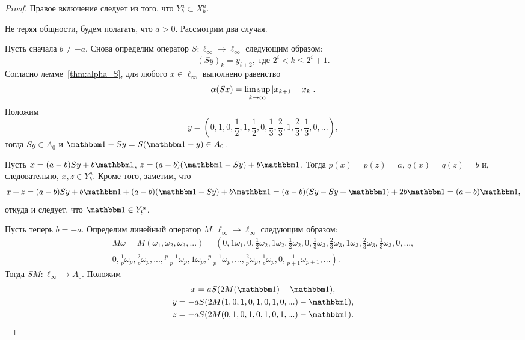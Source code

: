 \begin{proof}
	Правое включение следует из того, что $Y^a_b \subset X^a_b$.

	Не теряя общности, будем полагать, что $a>0$.
	Рассмотрим два случая.

	Пусть сначала $b \ne -a$.
	Снова определим оператор $S:\ell_\infty \to \ell_\infty$ следующим образом:
	\begin{equation}\label{operator_S}
		(Sy)_k = y_{i+2}, \mbox{ где } 2^i < k \leq 2^i+1
		.
	\end{equation}
	Согласно лемме~\ref{thm:alpha_S},
	для любого $x\in \ell_\infty$ выполнено равенство
	\begin{equation}\label{alpha_S}
		\alpha(Sx) = \varlimsup_{k\to\infty} |x_{k+1} - x_{k}|
		.
	\end{equation}
	Положим
	\begin{equation}
		\label{eq:y_for_s_alpha}
		y = \left(0,1,0,\frac{1}{2},1,\frac{1}{2},0,\frac{1}{3},\frac{2}{3},1,\frac{2}{3},\frac{1}{3},0,...\right)
		,
	\end{equation}
	тогда $Sy\in A_0$ и $\one-Sy = S(\one-y)\in A_0$.

	Пусть $x=(a-b)Sy+b\one$, $z=(a-b)(\one-Sy)+b\one$.
	Тогда $p(x)=p(z)=a$, $q(x)=q(z)=b$ и, следовательно, $x,z\in Y^a_b$.
	Кроме того, заметим, что
	\begin{equation}
		x+z = (a-b)Sy+b\one + (a-b)(\one-Sy)+b\one
		=
		(a-b)(Sy-Sy+\one) + 2 b\one = (a+b)\one
		,
	\end{equation}
	откуда и следует, что $\one\in Y^a_b$.

	Пусть теперь $b=-a$.
	Определим линейный оператор $M:\ell_\infty \to \ell_\infty$ следующим образом:
	\begin{multline}
		M\omega=
		M(\omega_1,\omega_2,\omega_3,...)=
		\left(
			0, 1\omega_1,
			0, \frac{1}{2}\omega_2, 1\omega_2, \frac{1}{2}\omega_2,
			0, \frac{1}{3}\omega_3, \frac{2}{3}\omega_3, 1\omega_3, \frac{2}{3}\omega_3, \frac{1}{3}\omega_3,
			0, ...,
		\right. \\ \left.
			0, \frac{1}{p}\omega_p, \frac{2}{p}\omega_p, ..., \frac{p-1}{p}\omega_p, 1\omega_p,
				\frac{p-1}{p}\omega_p, ..., \frac{2}{p}\omega_p, \frac{1}{p}\omega_p,
			0, \frac{1}{p+1}\omega_{p+1}, ...
		\right)
		.
	\end{multline}
	Тогда $SM: \ell_\infty \to A_0$.
	Положим
	\begin{gather}
		x=aS(2M(\one)-\one),
		\\
		y=-aS(2M(1,0,1,0,1,0,1,0,...)-\one),
		\\
		z=-aS(2M(0,1,0,1,0,1,0,1,...)-\one).
	\end{gather}


\end{proof}
